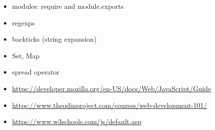 \begin{itemize}
\tightlist
\item
  modules: require and module.exports
\item
  regexps
\item
  backticks (string expansion)
\item
  Set, Map
\item
  spread operator
\item
  \url{https://developer.mozilla.org/en-US/docs/Web/JavaScript/Guide}
\item
  \url{https://www.theodinproject.com/courses/web-development-101/}
\item
  \url{https://www.w3schools.com/js/default.asp}
\end{itemize}
